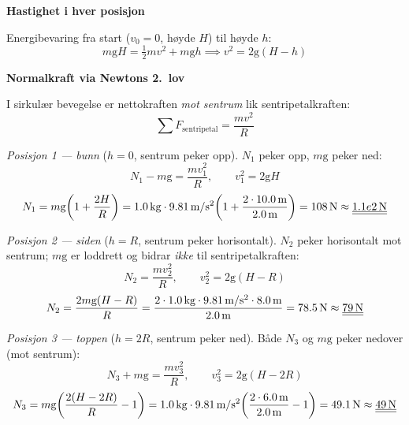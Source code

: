 {\begin{center}
\end{center}

\noindent\textbf{Hastighet i hver posisjon}

Energibevaring fra start ($v_0 = 0$, høyde $H$) til høyde $h$:
\[
  m\mathrm{g}H = \tfrac{1}{2}mv^2 + m\mathrm{g}h \implies v^2 = 2\mathrm{g}(H - h)
\]

\medskip
\noindent\textbf{Normalkraft via Newtons 2.\ lov}

I sirkulær bevegelse er nettokraften \emph{mot sentrum} lik sentripetalkraften:
\[
  \sum F_{\text{sentripetal}} = \frac{mv^2}{R}
\]

\medskip
\noindent\textit{Posisjon 1 — bunn} ($h = 0$, sentrum peker opp).
$N_1$ peker opp, $m\mathrm{g}$ peker ned:
\[
  N_1 - m\mathrm{g} = \frac{mv_1^2}{R}, \qquad v_1^2 = 2\mathrm{g}H
\]
\[
  N_1 = m\mathrm{g}\!\left(1 + \frac{2H}{R}\right)
      = 1.0\,\text{kg}\cdot9.81\,\text{m/s\ensuremath{^2}}
        \!\left(1 + \frac{2\cdot10.0\,\text{m}}{2.0\,\text{m}}\right)
      = 108\,\text{N} \approx \underline{\underline{1.1e2\,\text{N}}}
\]

\medskip
\noindent\textit{Posisjon 2 — siden} ($h = R$, sentrum peker horisontalt).
$N_2$ peker horisontalt mot sentrum; $m\mathrm{g}$ er loddrett og bidrar
\emph{ikke} til sentripetalkraften:
\[
  N_2 = \frac{mv_2^2}{R}, \qquad v_2^2 = 2\mathrm{g}(H - R)
\]
\[
  N_2 = \frac{2m\mathrm{g}(H - R)}{R}
      = \frac{2\cdot1.0\,\text{kg}\cdot9.81\,\text{m/s\ensuremath{^2}}
              \cdot8.0\,\text{m}}{2.0\,\text{m}}
      = 78.5\,\text{N} \approx \underline{\underline{79\,\text{N}}}
\]

\medskip
\noindent\textit{Posisjon 3 — toppen} ($h = 2R$, sentrum peker ned).
Både $N_3$ og $m\mathrm{g}$ peker nedover (mot sentrum):
\[
  N_3 + m\mathrm{g} = \frac{mv_3^2}{R}, \qquad v_3^2 = 2\mathrm{g}(H - 2R)
\]
\[
  N_3 = m\mathrm{g}\!\left(\frac{2(H - 2R)}{R} - 1\right)
      = 1.0\,\text{kg}\cdot9.81\,\text{m/s\ensuremath{^2}}
        \!\left(\frac{2\cdot6.0\,\text{m}}{2.0\,\text{m}} - 1\right)
      = 49.1\,\text{N} \approx \underline{\underline{49\,\text{N}}}
\]

}

